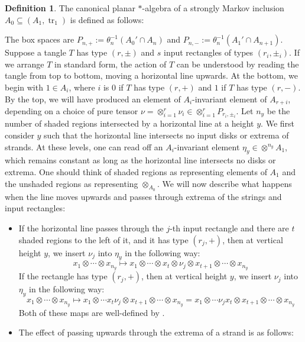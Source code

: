 \documentclass[11pt]{article}
\theoremstyle{plain}
\theoremstyle{definition}
\newtheorem{defn}[thm]{Definition}
\DeclareMathOperator{\tr}{tr}
\begin{document}
\begin{defn} 
The canonical planar $\ast$-algebra of a strongly Markov inclusion $A_0\subseteq (A_1,\tr_1)$ is defined as follows:

	The box spaces are $P_{n,+}:=\theta_n^{-1}(A_0'\cap A_{n}) $ and $P_{n,-}:=\theta_n^{-1}(A_1'\cap A_{n+1})$. Suppose a tangle $T$ has type $(r,\pm)$ and $s$ input rectangles of types $(r_i,\pm_i)$. If we arrange $T$ in standard form, the action of $T$ can be understood by reading the tangle from top to bottom, moving a horizontal line upwards. At the bottom, we begin with $1\in A_i$, where $i$ is $0$ if $T$ has type $(r,+)$ and $1$ if $T$ has type $(r,-)$. By the top, we will have produced an element of $A_i$-invariant element of $A_{r+i}$, depending on a choice of pure tensor $\nu=\otimes_{i=1}^r\nu_i\in\otimes_{i=1}^rP_{r_i,\pm_i}$. Let $n_y$ be the number of shaded regions intersected by a horizontal line at a height $y$. We first consider $y$ such that the horizontal line intersects no input disks or extrema of strands. At these levels, one can read off an $A_i$-invariant element $\eta_y\in \otimes^{n_y}A_1$, which remains constant as long as the horizontal line intersects no disks or extrema. One should think of shaded regions as representing elements of $A_1$ and the unshaded regions as representing $\otimes_{A_0}$. We will now describe what happens when the line moves upwards and passes through extrema of the strings and input rectangles:
	\begin{itemize}
	\item If the horizontal line passes through the $j$-th input rectangle and there are $t$ shaded regions to the left of it, and it has type $(r_j,+)$, then at vertical height $y$, we insert $\nu_j$ into $\eta_y$ in the following way:
	\[
	x_1\otimes\cdots \otimes x_{n_y} 
	\mapsto 
	x_1\otimes \cdots\otimes x_t\otimes \nu_j \otimes x_{t+1}\otimes \cdots\otimes x_{n_y}
	\]
	 If the rectangle has type $(r_j,+)$, then at vertical height $y$, we insert $\nu_j$ into	$\eta_y$ in the following way:
	\[
	x_1\otimes\cdots \otimes x_{n_y} 
	\mapsto 
	x_1\otimes \cdots x_t \nu_j \otimes x_{t+1}\otimes \cdots \otimes x_{n_y}
	=
	x_1\otimes \cdots \nu_j x_t  \otimes x_{t+1}\otimes \cdots \otimes x_{n_y}
	\]
	Both of these maps are well-defined by \cite[Lem.~2.29]{MR2812459}.
	\item The effect of passing upwards through the extrema of a strand is as follows: 
\begin{align*}
	&\begin{tikzpicture}[scale=0.6]

\end{tikzpicture}
\end{align*}
\end{itemize}
\end{defn}
\end{document}
